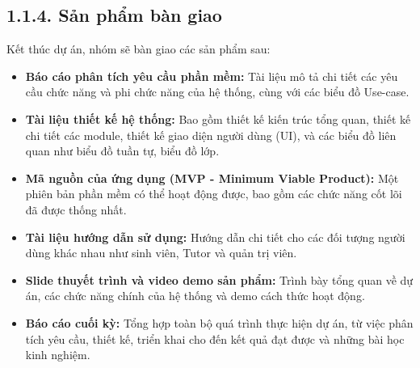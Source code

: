 \subsection*{1.1.4. Sản phẩm bàn giao}
Kết thúc dự án, nhóm sẽ bàn giao các sản phẩm sau:
\begin{itemize}
    \item \textbf{Báo cáo phân tích yêu cầu phần mềm:} Tài liệu mô tả chi tiết các yêu cầu chức năng và phi chức năng của hệ thống, cùng với các biểu đồ Use-case.
    \item \textbf{Tài liệu thiết kế hệ thống:}  Bao gồm thiết kế kiến trúc tổng quan, thiết kế chi tiết các module, thiết kế giao diện người dùng (UI), và các biểu đồ liên quan như biểu đồ tuần tự, biểu đồ lớp.
    \item \textbf{Mã nguồn của ứng dụng (MVP - Minimum Viable Product):} Một phiên bản phần mềm có thể hoạt động được, bao gồm các chức năng cốt lõi đã được thống nhất.
    \item \textbf{Tài liệu hướng dẫn sử dụng:} Hướng dẫn chi tiết cho các đối tượng người dùng khác nhau như sinh viên, Tutor và quản trị viên.
    \item \textbf{Slide thuyết trình và video demo sản phẩm:} Trình bày tổng quan về dự án, các chức năng chính của hệ thống và demo cách thức hoạt động.
    \item \textbf{Báo cáo cuối kỳ:} Tổng hợp toàn bộ quá trình thực hiện dự án, từ việc phân tích yêu cầu, thiết kế, triển khai cho đến kết quả đạt được và những bài học kinh nghiệm.
\end{itemize}
